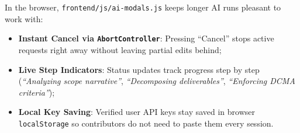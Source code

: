 \vspace{2mm}

\noindent In the browser, \texttt{frontend/\allowbreak js/\allowbreak ai-\allowbreak modals.js} keeps longer AI runs pleasant to work with:
\begin{itemize}[itemsep=1pt,topsep=1pt]
    \item \textbf{Instant Cancel via \texttt{AbortController}}: Pressing ``Cancel'' stops active requests right away without leaving partial edits behind;
    \item \textbf{Live Step Indicators}: Status updates track progress step by step (\textit{``Analyzing scope narrative''}, \textit{``Decomposing deliverables''}, \textit{``Enforcing DCMA criteria''});
    \item \textbf{Local Key Saving}: Verified user API keys stay saved in browser \texttt{localStorage} so contributors do not need to paste them every session.
\end{itemize}
